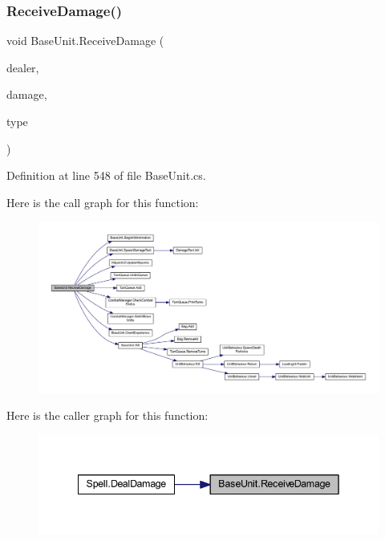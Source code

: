 \subsubsection{\texorpdfstring{ReceiveDamage()}{ReceiveDamage()}}
{\footnotesize\ttfamily void Base\+Unit.\+Receive\+Damage (\begin{DoxyParamCaption}\item[{\mbox{\hyperlink{class_base_unit}{Base\+Unit}}}]{dealer,  }\item[{int}]{damage,  }\item[{\mbox{\hyperlink{class_spell_a3e228beaf92e2c035e6599aaf0ac2d2a}{Spell.\+Damage\+Type}}}]{type }\end{DoxyParamCaption})}



Definition at line 548 of file Base\+Unit.\+cs.

Here is the call graph for this function\+:
\nopagebreak
\begin{figure}[H]
\begin{center}
\leavevmode
\includegraphics[width=350pt]{class_base_unit_a8412f2b3e8ec9c3ff75b41b830fde443_cgraph}
\end{center}
\end{figure}
Here is the caller graph for this function\+:
\nopagebreak
\begin{figure}[H]
\begin{center}
\leavevmode
\includegraphics[width=342pt]{class_base_unit_a8412f2b3e8ec9c3ff75b41b830fde443_icgraph}
\end{center}
\end{figure}
\mbox{\label{class_base_unit_a0f900d0c70a2436dd81d8127f8d43336}} 
